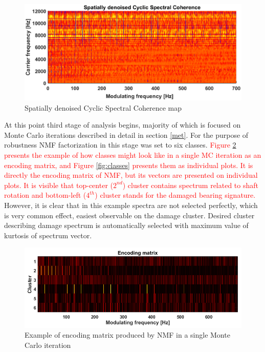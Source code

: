 \documentclass[3p, 12pt]{elsarticle} %
\begin{document}
\begin{figure}[ht!]
\centering
\includegraphics[width=.75\textwidth]{wykresy/csc3}
\caption{Spatially denoised Cyclic Spectral Coherence map}
\label{fig:csc3}
\end{figure}

At this point third stage of analysis begins, majority of which is focused on Monte Carlo iterations described in detail in section \ref{met}. For the purpose of robustness NMF factorization in this stage was set to six classes. \textcolor{red}{Figure \ref{fig:enc} presents the example of how classes might look like in a single MC iteration as an encoding matrix, and Figure \ref{fig:classes} presents them as individual plots. It is directly the encoding matrix of NMF, but its vectors are presented on individual plots. It is visible that top-center ($2^{nd}$) cluster contains spectrum related to shaft rotation and bottom-left ($4^{th}$) cluster stands for the damaged bearing signature.} However, it is clear that in this example spectra are not selected perfectly, which is very common effect, easiest observable on the damage cluster. Desired cluster describing damage spectrum is automatically selected with maximum value of kurtosis of spectrum vector. 
\begin{figure}[ht!]
\centering
\includegraphics[width=.8\textwidth]{wykresy/enc2.png}
\caption{Example of encoding matrix produced by NMF in a single Monte Carlo iteration}
\label{fig:enc}
\end{figure}
\end{document}
